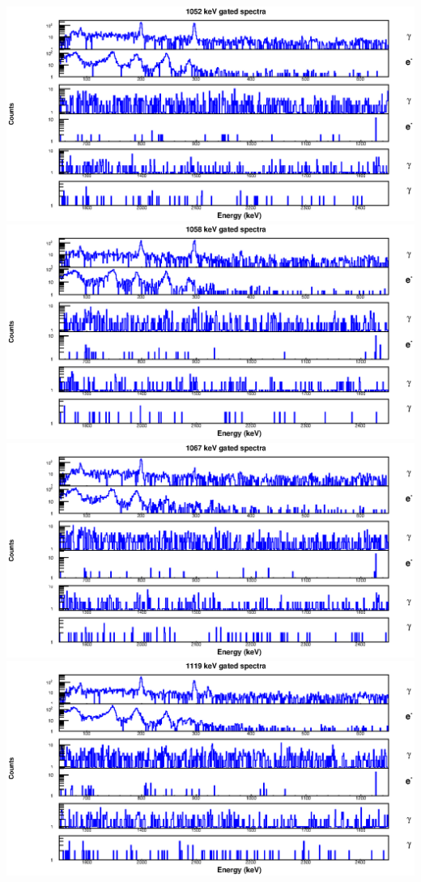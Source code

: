 \begin{landscape}
\includegraphics[scale=1.2]{156Gd_Appendix/1052_combined.eps}
\includegraphics[scale=1.2]{156Gd_Appendix/1058_combined.eps}
\includegraphics[scale=1.2]{156Gd_Appendix/1067_combined.eps}
\includegraphics[scale=1.2]{156Gd_Appendix/1119_combined.eps}

\end{landscape}
